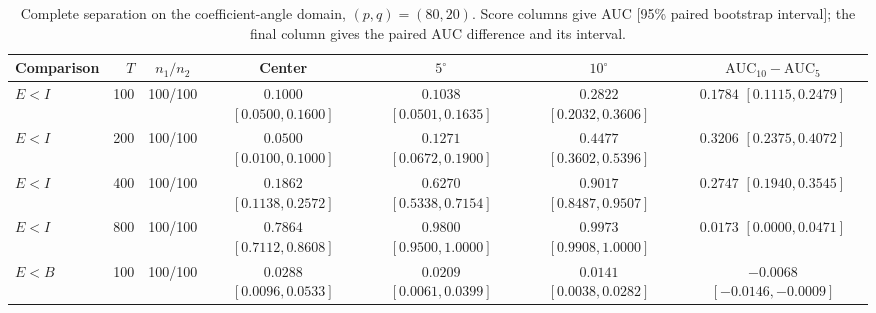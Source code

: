\documentclass[12pt,letterpaper]{article}
\def\spacingset#1{\renewcommand{\baselinestretch}{#1}\small\normalsize}
\theoremstyle{plain}
\theoremstyle{definition}
\begin{document}
\begin{table}[p]
\begingroup
\spacingset{1.0}
\small\centering
\caption{Complete separation on the coefficient-angle domain, $(p,q)=(80,20)$. Score columns give AUC [95\% paired bootstrap interval]; the final column gives the paired AUC difference and its interval.}
\label{s23:lambda:allauc:p80q20}
\footnotesize
\setlength{\tabcolsep}{3.5pt}
\renewcommand{\arraystretch}{1.10}
\begin{adjustbox}{max width=\linewidth}
\begin{tabular}{lrccccc}
\toprule
Comparison & $T$ & $n_1/n_2$ & Center & $5^\circ$ & $10^\circ$ & $\mathrm{AUC}_{10}-\mathrm{AUC}_{5}$\\
\midrule
$E<I$ & 100 & 100/100 & \shortstack{$0.1000$\\{\scriptsize$[0.0500,0.1600]$}} & \shortstack{$0.1038$\\{\scriptsize$[0.0501,0.1635]$}} & \shortstack{$0.2822$\\{\scriptsize$[0.2032,0.3606]$}} & \shortstack{$0.1784$\\{\scriptsize$[0.1115,0.2479]$}}\\
$E<I$ & 200 & 100/100 & \shortstack{$0.0500$\\{\scriptsize$[0.0100,0.1000]$}} & \shortstack{$0.1271$\\{\scriptsize$[0.0672,0.1900]$}} & \shortstack{$0.4477$\\{\scriptsize$[0.3602,0.5396]$}} & \shortstack{$0.3206$\\{\scriptsize$[0.2375,0.4072]$}}\\
$E<I$ & 400 & 100/100 & \shortstack{$0.1862$\\{\scriptsize$[0.1138,0.2572]$}} & \shortstack{$0.6270$\\{\scriptsize$[0.5338,0.7154]$}} & \shortstack{$0.9017$\\{\scriptsize$[0.8487,0.9507]$}} & \shortstack{$0.2747$\\{\scriptsize$[0.1940,0.3545]$}}\\
$E<I$ & 800 & 100/100 & \shortstack{$0.7864$\\{\scriptsize$[0.7112,0.8608]$}} & \shortstack{$0.9800$\\{\scriptsize$[0.9500,1.0000]$}} & \shortstack{$0.9973$\\{\scriptsize$[0.9908,1.0000]$}} & \shortstack{$0.0173$\\{\scriptsize$[0.0000,0.0471]$}}\\
\addlinespace
$E<B$ & 100 & 100/100 & \shortstack{$0.0288$\\{\scriptsize$[0.0096,0.0533]$}} & \shortstack{$0.0209$\\{\scriptsize$[0.0061,0.0399]$}} & \shortstack{$0.0141$\\{\scriptsize$[0.0038,0.0282]$}} & \shortstack{$-0.0068$\\{\scriptsize$[-0.0146,-0.0009]$}}\\

\end{tabular}
\end{adjustbox}
\end{table}
\end{document}
